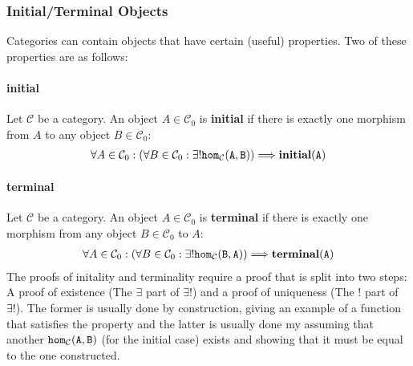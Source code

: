 \subsubsection{Initial/Terminal Objects}
Categories can contain objects that have certain (useful) properties.
Two of these properties are as follows:
\paragraph{initial} Let $\mathcal{C}$ be a category. An object $A\in\mathcal{C}_0$ is \textbf{initial} if there is exactly one morphism from $A$ to any object $B\in\mathcal{C}_0$: 
    \begin{align*}
        \forall A\in\mathcal{C}_0:(\forall B\in\mathcal{C}_0: \exists! \tt{hom}_\mathcal{C}(A,B)) \Longrightarrow \textbf{initial}(A)
    \end{align*}
\paragraph{terminal} Let $\mathcal{C}$ be a category. An object $A\in\mathcal{C}_0$ is \textbf{terminal} if there is exactly one morphism from any object $B\in\mathcal{C}_0$ to $A$:
    \begin{align*}
        \forall A\in\mathcal{C}_0:(\forall B\in\mathcal{C}_0: \exists! \tt{hom}_\mathcal{C}(B,A)) \Longrightarrow \textbf{terminal}(A)
    \end{align*}
The proofs of initality and terminality require a proof that is split into two steps: A proof of existence (The $\exists$ part of $\exists!$) and a proof of uniqueness (The $!$ part of $\exists!$).
The former is usually done by construction, giving an example of a function that satisfies the property and the latter is usually done my assuming that another $\tt{hom}_\mathcal{C}(A,B)$ (for the initial case) exists and showing that it must be equal to the one constructed.

